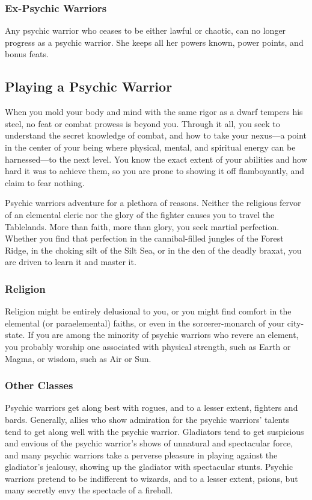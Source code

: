 \subsubsection{Ex-Psychic Warriors}
Any psychic warrior who ceases to be either lawful or chaotic, can no longer progress as a psychic warrior. She keeps all her powers known, power points, and bonus feats.

\subsection{Playing a Psychic Warrior}
When you mold your body and mind with the same rigor as a dwarf tempers his steel, no feat or combat prowess is beyond you. Through it all, you seek to understand the secret knowledge of combat, and how to take your nexus---a point in the center of your being where physical, mental, and spiritual energy can be harnessed---to the next level. You know the exact extent of your abilities and how hard it was to achieve them, so you are prone to showing it off flamboyantly, and claim to fear nothing.

Psychic warriors adventure for a plethora of reasons. Neither the religious fervor of an elemental cleric nor the glory of the fighter causes you to travel the Tablelands. More than faith, more than glory, you seek martial perfection. Whether you find that perfection in the cannibal-filled jungles of the Forest Ridge, in the choking silt of the Silt Sea, or in the den of the deadly braxat, you are driven to learn it and master it.


\subsubsection{Religion}
Religion might be entirely delusional to you, or you might find comfort in the elemental (or paraelemental) faiths, or even in the sorcerer-monarch of your city-state. If you are among the minority of psychic warriors who revere an element, you probably worship one associated with physical strength, such as Earth or Magma, or wisdom, such as Air or Sun.

\subsubsection{Other Classes}
Psychic warriors get along best with rogues, and to a lesser extent, fighters and bards. Generally, allies who show admiration for the psychic warriors' talents tend to get along well with the psychic warrior. Gladiators tend to get suspicious and envious of the psychic warrior's shows of unnatural and spectacular force, and many psychic warriors take a perverse pleasure in playing against the gladiator's jealousy, showing up the gladiator with spectacular stunts. Psychic warriors pretend to be indifferent to wizards, and to a lesser extent, psions, but many secretly envy the spectacle of a fireball.

